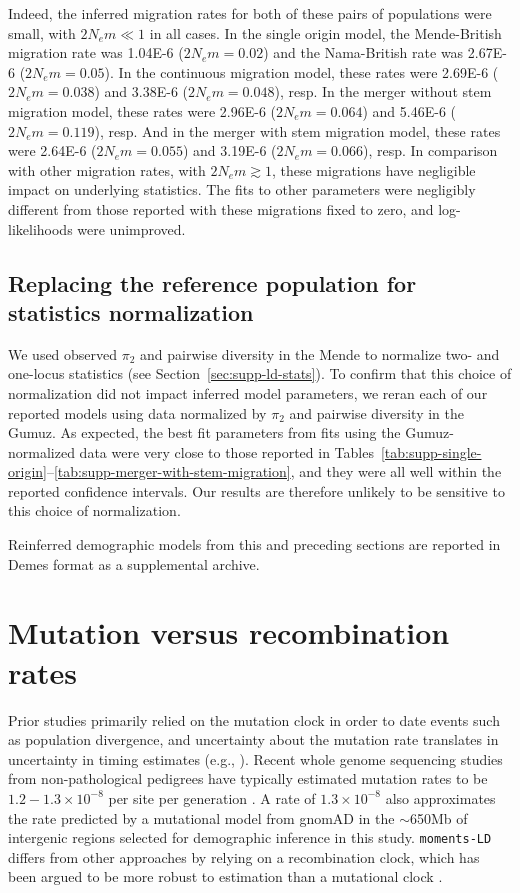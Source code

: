 \documentclass[]{article}
\begin{document}
Indeed, the inferred migration rates for both of these pairs of populations
were small, with $2N_em \ll 1$ in all cases. In the single origin model, the
Mende-British migration rate was 1.04E-6 ($2N_em = 0.02$) and the Nama-British
rate was 2.67E-6 ($2N_em = 0.05$). In the continuous migration model, these
rates were 2.69E-6 ($2N_em = 0.038$) and 3.38E-6 ($2N_em = 0.048$), resp. In
the merger without stem migration model, these rates were 2.96E-6 ($2N_em =
0.064$) and 5.46E-6 ($2N_em=0.119$), resp. And in the merger with stem
migration model, these rates were 2.64E-6 ($2N_em = 0.055$) and 3.19E-6 ($2N_em
= 0.066$), resp. In comparison with other migration rates, with $2N_em \gtrsim
1$, these migrations have negligible impact on underlying statistics. The fits
to other parameters were negligibly different from those reported with these
migrations fixed to zero, and log-likelihoods were unimproved.

\subsection{Replacing the reference population for statistics normalization}

We used observed $\pi_2$ and pairwise diversity in the Mende to normalize two-
and one-locus statistics (see Section~\ref{sec:supp-ld-stats}). To confirm that
this choice of normalization did not impact inferred model parameters, we reran
each of our reported models using data normalized by $\pi_2$ and pairwise
diversity in the Gumuz. As expected, the best fit parameters from fits using
the Gumuz-normalized data were very close to those reported in
Tables~\ref{tab:supp-single-origin}--\ref{tab:supp-merger-with-stem-migration},
and they were all well within the reported confidence intervals. Our results
are therefore unlikely to be sensitive to this choice of normalization.

Reinferred demographic models from this and preceding sections are reported in
Demes format \citep{Gower2022-yn} as a supplemental archive.

\section{Mutation versus recombination rates}
\label{sec:supp-mutation}

Prior studies primarily relied on the mutation clock in order to date events
such as population divergence, and uncertainty about the mutation rate
translates in uncertainty in timing estimates (e.g., \citet{Moorjani2016-qj}).
Recent whole genome sequencing studies from non-pathological pedigrees have
typically estimated mutation rates to be $1.2-1.3\times10^{-8}$ per site per
generation \citep{Sasani2019-zp,Tian2019-zv}. A rate of $1.3\times10^{-8}$ also
approximates the rate predicted by a mutational model from gnomAD
\citep{Karczewski2020-le} in the $\sim$650Mb of intergenic regions selected for
demographic inference in this study.
\texttt{moments-LD} differs from other approaches by
relying on a recombination clock, which has been argued to be more robust to
estimation than a mutational clock \citep{Moorjani2016-ur}.
\end{document}
